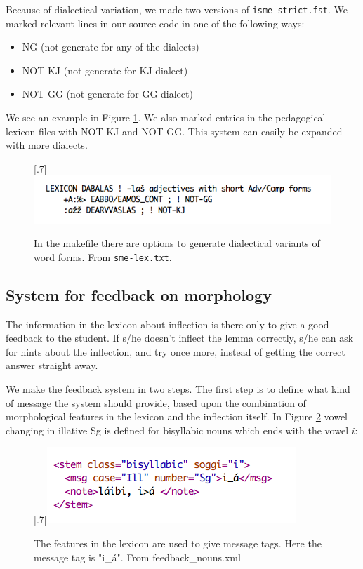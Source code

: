 \documentclass[a4paper,12pt]{article}
\begin{document}
Because of dialectical variation, we made two versions of \texttt{isme-strict.fst}. We marked relevant lines in our source code in one of the following ways:
\begin {itemize}
\item NG (not generate for any of the dialects)
\item NOT-KJ (not generate for KJ-dialect) 
\item NOT-GG (not generate for GG-dialect)  
\end {itemize}

We see an example in Figure \ref{smelex}. We also marked entries in the pedagogical lexicon-files with NOT-KJ and NOT-GG. This system can easily be expanded with more dialects.


\begin{figure}[htbp]
\begin{center}
\scalebox{.7}[.7]{\includegraphics{img/smelex.png}}\\
\caption{In the makefile there are options to generate dialectical variants of word forms. From \texttt{sme-lex.txt}.}
\label{smelex}
\end{center}
\end{figure}


\subsection{System for feedback on morphology}

The information in the lexicon about inflection is there only to give a good feedback to the student. If s/he doesn't inflect the lemma correctly, s/he can ask for hints about the inflection, and try once more, instead of getting the correct answer straight away. 

We make the feedback system in two steps. The first step is to define what kind of message the system  should provide, based upon the combination of morphological features in the lexicon and the inflection itself. In Figure \ref{feedbacknouns} vowel changing in illative Sg is defined for bisyllabic nouns which ends with the vowel $i$:


\begin{figure}[htbp]
\begin{center}
\scalebox{.7}[.7]{\includegraphics{img/feedback_nouns.png}}\\
\caption{The features in the lexicon are used to give message tags. Here the message tag is "i\_á". From feedback\_nouns.xml}
\label{feedbacknouns}
\end{center}
\end{figure}
\end{document}
